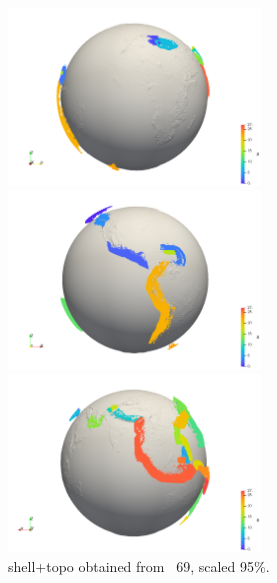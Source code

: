 \begin{center}
\includegraphics[width=6.7cm]{python_codes/fieldstone_135/images/id2.png}\\
\includegraphics[width=6.7cm]{python_codes/fieldstone_135/images/id3.png}
\includegraphics[width=6.7cm]{python_codes/fieldstone_135/images/id4.png}\\
{\captionfont shell+topo obtained from \stone~69, scaled 95\%.}
\end{center}
